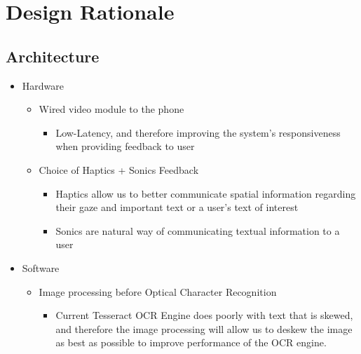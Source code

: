 \chapter{Design Rationale}

	\section{Architecture}
		\begin{itemize}
			\item Hardware
			\begin{itemize}
				\item Wired video module to the phone
				\begin{itemize}
					\item Low-Latency, and therefore improving the system’s responsiveness when providing feedback to user
				\end{itemize}
				\item Choice of Haptics + Sonics Feedback
				\begin{itemize}
					\item Haptics allow us to better communicate spatial information regarding their gaze and important text or a user’s text of interest
					\item Sonics are natural way of communicating textual information to a user
				\end{itemize}
			\end{itemize}


			\item Software
			\begin{itemize}
				\item Image processing before Optical Character Recognition
				\begin{itemize}
					\item Current Tesseract OCR Engine does poorly with text that is skewed, and therefore the image processing will allow us to deskew the image as best as possible to improve performance of the OCR engine.
				\end{itemize}
			\end{itemize}
		\end{itemize}
\pagebreak

